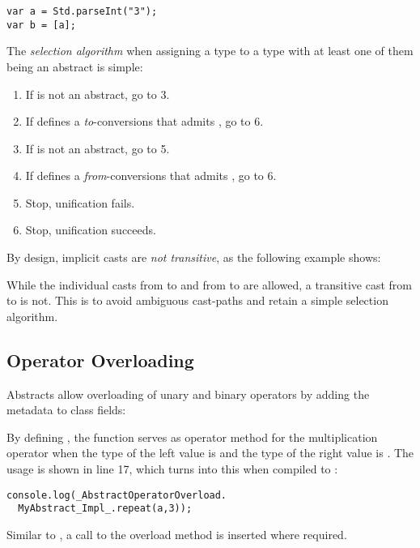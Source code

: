\begin{lstlisting}
var a = Std.parseInt("3");
var b = [a];
\end{lstlisting}
The \emph{selection algorithm} when assigning a type  to a type  with at least one of them being an abstract is simple:

\begin{enumerate}
	\item If  is not an abstract, go to 3.
	\item If  defines a \emph{to}-conversions that admits , go to 6.
	\item If  is not an abstract, go to 5.
	\item If  defines a \emph{from}-conversions that admits , go to 6.
	\item Stop, unification fails.
	\item Stop, unification succeeds.
\end{enumerate}



By design, implicit casts are \emph{not transitive}, as the following example shows:

While the individual casts from  to  and from  to  are allowed, a transitive cast from  to  is not. This is to avoid ambiguous cast-paths and retain a simple selection algorithm. 




\subsection{Operator Overloading}
\label{types-abstract-operator-overloading}

Abstracts allow overloading of unary and binary operators by adding the  metadata to class fields:

By defining , the function  serves as operator method for the multiplication \expr{*} operator when the type of the left value is  and the type of the right value is . The usage is shown in line 17, which turns into this when compiled to :

\begin{lstlisting}
console.log(_AbstractOperatorOverload.
  MyAbstract_Impl_.repeat(a,3));
\end{lstlisting}
Similar to , a call to the overload method is inserted where required.

